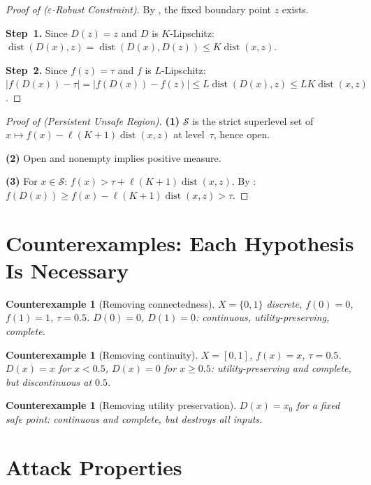 \documentclass{article}
\newtheorem{counterexample}[theorem]{Counterexample}
\newcommand{\dist}{\operatorname{dist}}
\begin{document}
\begin{proof}[Proof of  ($\varepsilon$-Robust Constraint)]
By , the fixed boundary point $z$ exists.

\textbf{Step~1.} Since $D(z) = z$ and $D$ is $K$-Lipschitz:
$\dist(D(x), z) = \dist(D(x), D(z)) \leq K\dist(x, z)$.

\textbf{Step~2.} Since $f(z) = \tau$ and $f$ is $L$-Lipschitz:
$|f(D(x)) - \tau| = |f(D(x)) - f(z)| \leq L\dist(D(x), z) \leq
LK\dist(x, z)$.
\end{proof}

\begin{proof}[Proof of  (Persistent Unsafe Region)]
\textbf{(1)} $\mathcal{S}$ is the strict superlevel set of
$x \mapsto f(x) - \ell(K+1)\dist(x,z)$ at level~$\tau$, hence open.

\textbf{(2)} Open and nonempty implies positive measure.

\textbf{(3)} For $x \in \mathcal{S}$:
$f(x) > \tau + \ell(K+1)\dist(x,z)$. By :
$f(D(x)) \geq f(x) - \ell(K+1)\dist(x,z) > \tau$.
\end{proof}


\section{Counterexamples: Each Hypothesis Is Necessary}
\label{app:counterexamples}

\begin{counterexample}[Removing connectedness]
$X = \{0,1\}$ discrete, $f(0)=0$, $f(1)=1$, $\tau=0.5$.
$D(0)=0$, $D(1)=0$: continuous, utility-preserving, complete.
\end{counterexample}

\begin{counterexample}[Removing continuity]
$X=[0,1]$, $f(x)=x$, $\tau=0.5$. $D(x)=x$ for $x<0.5$,
$D(x)=0$ for $x \geq 0.5$: utility-preserving and complete,
but discontinuous at $0.5$.
\end{counterexample}

\begin{counterexample}[Removing utility preservation]
$D(x) = x_0$ for a fixed safe point: continuous and complete,
but destroys all inputs.
\end{counterexample}


\section{Attack Properties}
\label{app:attacks}
\end{document}
